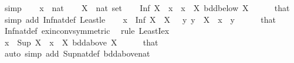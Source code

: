 \begin{isabellebody}
\isamarkupfalse%
\ simp%
\endisatagproof
{\isafoldproof}%
%
\isadelimproof
\isanewline
%
\endisadelimproof
\isanewline
{}\isamarkupfalse%
\isanewline
%
\isadelimproof
%
\endisadelimproof
%
\isatagproof
{}\isamarkupfalse%
\isanewline
\ \ \isamarkupfalse%
\ x\ {\isacharcolon}{\kern0pt}{\isacharcolon}{\kern0pt}\ nat\isanewline
\ \ \isamarkupfalse%
\ X\ {\isacharcolon}{\kern0pt}{\isacharcolon}{\kern0pt}\ {\isachardoublequoteopen}nat\ set{\isachardoublequoteclose}\isanewline
\ \ \isamarkupfalse%
\ {\isachardoublequoteopen}Inf\ X\ {\isasymle}\ x{\isachardoublequoteclose}\ \ {\isachardoublequoteopen}x\ {\isasymin}\ X{\isachardoublequoteclose}\ {\isachardoublequoteopen}bdd{\isacharunderscore}{\kern0pt}below\ X{\isachardoublequoteclose}\isanewline
\ \ \ \ \isamarkupfalse%
\ that\ \isamarkupfalse%
\ {\isacharparenleft}{\kern0pt}simp\ add{\isacharcolon}{\kern0pt}\ Inf{\isacharunderscore}{\kern0pt}nat{\isacharunderscore}{\kern0pt}def\ Least{\isacharunderscore}{\kern0pt}le{\isacharparenright}{\kern0pt}\isanewline
\ \ \isamarkupfalse%
\ {\isachardoublequoteopen}x\ {\isasymle}\ Inf\ X{\isachardoublequoteclose}\ \ {\isachardoublequoteopen}X\ {\isasymnoteq}\ {\isacharbraceleft}{\kern0pt}{\isacharbraceright}{\kern0pt}{\isachardoublequoteclose}\ {\isachardoublequoteopen}{\isasymAnd}y{\isachardot}{\kern0pt}\ y\ {\isasymin}\ X\ {\isasymLongrightarrow}\ x\ {\isasymle}\ y{\isachardoublequoteclose}\isanewline
\ \ \ \ \isamarkupfalse%
\ that\ \isamarkupfalse%
\ Inf{\isacharunderscore}{\kern0pt}nat{\isacharunderscore}{\kern0pt}def\ ex{\isacharunderscore}{\kern0pt}in{\isacharunderscore}{\kern0pt}conv{\isacharbrackleft}{\kern0pt}symmetric{\isacharbrackright}{\kern0pt}\ \isamarkupfalse%
\ {\isacharparenleft}{\kern0pt}rule\ LeastI{}{\isacharunderscore}{\kern0pt}ex{\isacharparenright}{\kern0pt}\isanewline
\ \ \isamarkupfalse%
\ {\isachardoublequoteopen}x\ {\isasymle}\ Sup\ X{\isachardoublequoteclose}\ \ {\isachardoublequoteopen}x\ {\isasymin}\ X{\isachardoublequoteclose}\ {\isachardoublequoteopen}bdd{\isacharunderscore}{\kern0pt}above\ X{\isachardoublequoteclose}\isanewline
\ \ \ \ \isamarkupfalse%
\ that\ \isamarkupfalse%
\ {\isacharparenleft}{\kern0pt}auto\ simp\ add{\isacharcolon}{\kern0pt}\ Sup{\isacharunderscore}{\kern0pt}nat{\isacharunderscore}{\kern0pt}def\ bdd{\isacharunderscore}{\kern0pt}above{\isacharunderscore}{\kern0pt}nat{\isacharparenright}{\kern0pt}\isanewline

\end{isabellebody}
